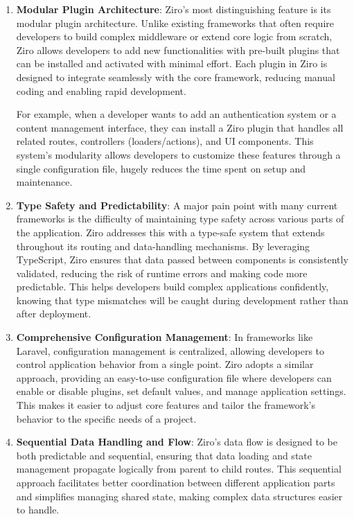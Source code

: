 \begin{enumerate}
	\item \textbf{Modular Plugin Architecture}: Ziro’s most distinguishing feature is its modular plugin architecture. Unlike existing frameworks that often require developers to build complex middleware or extend core logic from scratch, Ziro allows developers to add new functionalities with pre-built plugins that can be installed and activated with minimal effort. Each plugin in Ziro is designed to integrate seamlessly with the core framework, reducing manual coding and enabling rapid development.

	For example, when a developer wants to add an authentication system or a content management interface, they can install a Ziro plugin that handles all related routes, controllers (loaders/actions), and UI components. This system’s modularity allows developers to customize these features through a single configuration file, hugely reduces the time spent on setup and maintenance.

	\item \textbf{Type Safety and Predictability}: A major pain point with many current frameworks is the difficulty of maintaining type safety across various parts of the application. Ziro addresses this with a type-safe system that extends throughout its routing and data-handling mechanisms. By leveraging TypeScript, Ziro ensures that data passed between components is consistently validated, reducing the risk of runtime errors and making code more predictable. This helps developers build complex applications confidently, knowing that type mismatches will be caught during development rather than after deployment.

	\item \textbf{Comprehensive Configuration Management}: In frameworks like Laravel, configuration management is centralized, allowing developers to control application behavior from a single point. Ziro adopts a similar approach, providing an easy-to-use configuration file where developers can enable or disable plugins, set default values, and manage application settings. This makes it easier to adjust core features and tailor the framework’s behavior to the specific needs of a project.

	\item \textbf{Sequential Data Handling and Flow}: Ziro’s data flow is designed to be both predictable and sequential, ensuring that data loading and state management propagate logically from parent to child routes. This sequential approach facilitates better coordination between different application parts and simplifies managing shared state, making complex data structures easier to handle.


\end{enumerate}
